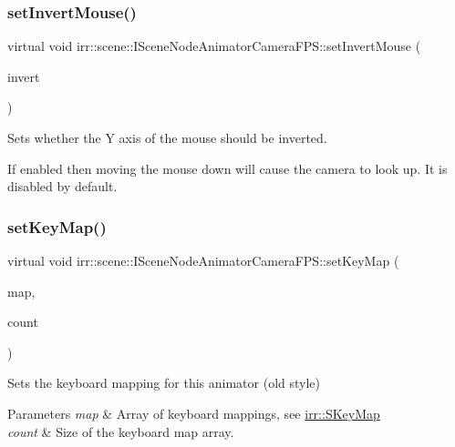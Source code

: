 \subsubsection{\texorpdfstring{set\+Invert\+Mouse()}{setInvertMouse()}}
{\footnotesize\ttfamily virtual void irr\+::scene\+::\+I\+Scene\+Node\+Animator\+Camera\+F\+P\+S\+::set\+Invert\+Mouse (\begin{DoxyParamCaption}\item[{bool}]{invert }\end{DoxyParamCaption})\hspace{0.3cm}{\ttfamily [pure virtual]}}



Sets whether the Y axis of the mouse should be inverted. 

If enabled then moving the mouse down will cause the camera to look up. It is disabled by default. \mbox{\label{classirr_1_1scene_1_1ISceneNodeAnimatorCameraFPS_a449aba2c0047f895e417a872505c02ce}} 
\subsubsection{\texorpdfstring{set\+Key\+Map()}{setKeyMap()}\hspace{0.1cm}{\footnotesize\ttfamily [1/2]}}
{\footnotesize\ttfamily virtual void irr\+::scene\+::\+I\+Scene\+Node\+Animator\+Camera\+F\+P\+S\+::set\+Key\+Map (\begin{DoxyParamCaption}\item[{\hyperlink{structirr_1_1SKeyMap}{S\+Key\+Map} $\ast$}]{map,  }\item[{\hyperlink{namespaceirr_a0416a53257075833e7002efd0a18e804}{u32}}]{count }\end{DoxyParamCaption})\hspace{0.3cm}{\ttfamily [pure virtual]}}



Sets the keyboard mapping for this animator (old style) 


\begin{DoxyParams}{Parameters}
{\em map} & Array of keyboard mappings, see \hyperlink{structirr_1_1SKeyMap}{irr\+::\+S\+Key\+Map} \\
\hline
{\em count} & Size of the keyboard map array. \\
\hline
\end{DoxyParams}
\mbox{\label{classirr_1_1scene_1_1ISceneNodeAnimatorCameraFPS_a9a76aeafb9fe79a13b7b128b3eb3b103}} 

